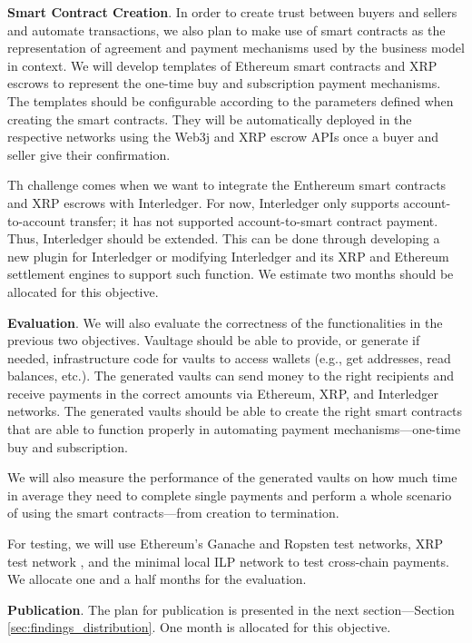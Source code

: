 \documentclass[]{article}
\begin{document}
\textbf{Smart Contract Creation}. 
In order to create trust between buyers and sellers and automate transactions, we also plan to make use of smart contracts as the representation of agreement and payment mechanisms used by the business model in context. We will develop templates of Ethereum smart contracts and XRP escrows to represent the one-time buy and subscription payment mechanisms. The templates should be configurable according to the parameters defined when creating the smart contracts.    
They will be automatically deployed in the respective networks using the Web3j and XRP escrow APIs once a buyer and seller give their confirmation.

Th challenge comes when we want to integrate the Enthereum smart contracts and XRP escrows with Interledger. For now, Interledger only supports account-to-account transfer; it has not supported account-to-smart contract payment. Thus, Interledger should be extended. This can be done through developing a new plugin \cite{interledger-plugin} for Interledger or modifying Interledger \cite{interledger-rs} and its XRP and Ethereum settlement engines \cite{xrp-settlement,eth-settlement} to support such function.  We estimate two months should be allocated for this objective.
 
\textbf{Evaluation}. We will also evaluate the correctness of the functionalities in the previous two objectives. Vaultage should be able to provide, or generate if needed, infrastructure code for vaults to access wallets (e.g., get addresses, read balances, etc.). The generated vaults can send money to the right recipients and receive payments in the correct amounts via Ethereum, XRP, and Interledger networks. The generated vaults should be able to create the right smart contracts that are able to function properly in automating payment mechanisms---one-time buy and subscription.

We will also measure the performance of the generated vaults on how much time in average they need to complete single payments and perform a whole scenario of using the smart contracts---from creation to termination. 

For testing, we will use Ethereum's Ganache \cite{ganache} and Ropsten \cite{ropsten} test networks, XRP test network \cite{xrp-testnet}, and the minimal local ILP network \cite{ilp-testnet} to test cross-chain payments. We allocate one and a half months for the evaluation. 

\textbf{Publication}. The plan for publication is presented in the next section---Section \ref{sec:findings_distribution}. One month is allocated for this objective.   
\end{document}

